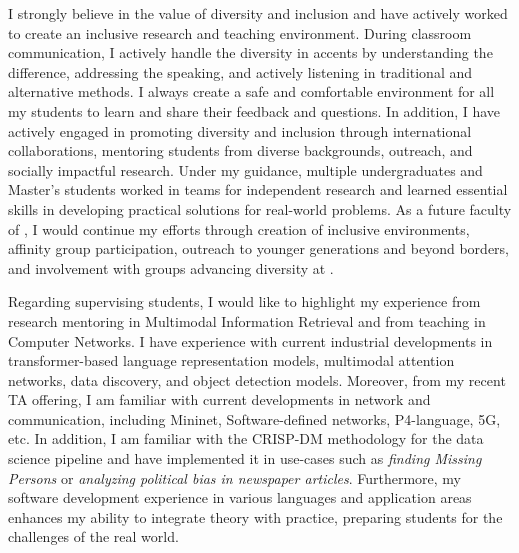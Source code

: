 \documentclass[10pt]{article}
\renewcommand*\paragraph[1]{}
\begin{document}
\paragraph{Diversity}
I strongly believe in the value of diversity and inclusion and have actively worked to create an inclusive research and teaching environment. During classroom communication, I actively handle the diversity in accents by understanding the difference, addressing the speaking, and actively listening in traditional and alternative methods.
I always create a safe and comfortable environment for all my students to learn and share their feedback and questions. In addition, I have actively engaged in promoting diversity and inclusion through international collaborations, mentoring students from diverse backgrounds, outreach, and socially impactful research. Under my guidance, multiple undergraduates and Master's students worked in teams for independent research and learned essential skills in developing practical solutions for real-world problems. As a future faculty of \shortInstitutionName{}, I would continue my efforts through 
creation of inclusive environments, affinity group participation, outreach to younger generations and beyond borders, and involvement with groups advancing diversity at \shortInstitutionName{}. 

\paragraph{P3) Relevant industrial experience beneficial to CS/ DS curriculum development and CS/DS capstone project advising}
Regarding supervising students, I would like to highlight my experience from research mentoring in Multimodal Information Retrieval and from teaching in Computer Networks. I have experience with current industrial developments in transformer-based language representation models, multimodal attention networks, data discovery, and object detection models. 
Moreover, from my recent TA offering, I am familiar with current developments in network and communication, including Mininet, Software-defined networks, P4-language, 5G, etc. 
In addition, I am familiar with the CRISP-DM methodology for the data science pipeline and have implemented it in use-cases such as \textit{finding Missing Persons} or \textit{analyzing political bias in newspaper articles}. 
Furthermore, my software development experience in various languages and application areas enhances my ability to integrate theory with practice, preparing students for the challenges of the real world.
\end{document}
